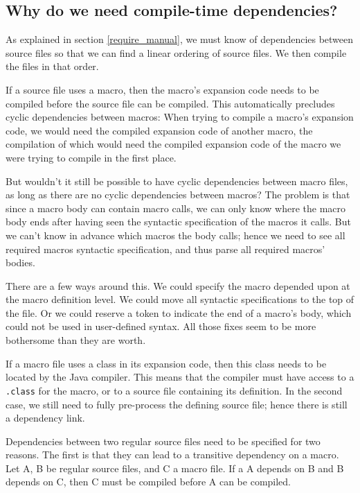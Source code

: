 \subsection{Why do we need compile-time dependencies?}
\label{why_source_deps}

As explained in section \ref{require_manual}, we must know of dependencies
between source files so that we can find a linear ordering of source files. We
then compile the files in that order.

If a source file uses a macro, then the macro's expansion code needs to be
compiled before the source file can be compiled. This automatically precludes
cyclic dependencies between macros: When trying to compile a macro's expansion
code, we would need the compiled expansion code of another macro, the
compilation of which would need the compiled expansion code of the macro we were
trying to compile in the first place.

But wouldn't it still be possible to have cyclic dependencies between macro
files, as long as there are no cyclic dependencies between macros? The problem
is that since a macro body can contain macro calls, we can only know where the
macro body ends after having seen the syntactic specification of the macros it
calls. But we can't know in advance which macros the body calls; hence we need
to see all required macros syntactic specification, and thus parse all required
macros' bodies.

There are a few ways around this. We could specify the macro depended upon at
the macro definition level. We could move all syntactic specifications to the
top of the file. Or we could reserve a token to indicate the end of a macro's
body, which could not be used in user-defined syntax. All those fixes seem to be
more bothersome than they are worth.

If a macro file uses a class in its expansion code, then this class needs to be
located by the Java compiler. This means that the compiler must have access to a
\texttt{.class} for the macro, or to a source file containing its definition. In
the second case, we still need to fully pre-process the defining source file;
hence there is still a dependency link.

Dependencies between two regular source files need to be specified for two
reasons. The first is that they can lead to a transitive dependency on a
macro. Let A, B be regular source files, and C a macro file. If a A depends on B
and B depends on C, then C must be compiled before A can be compiled.

